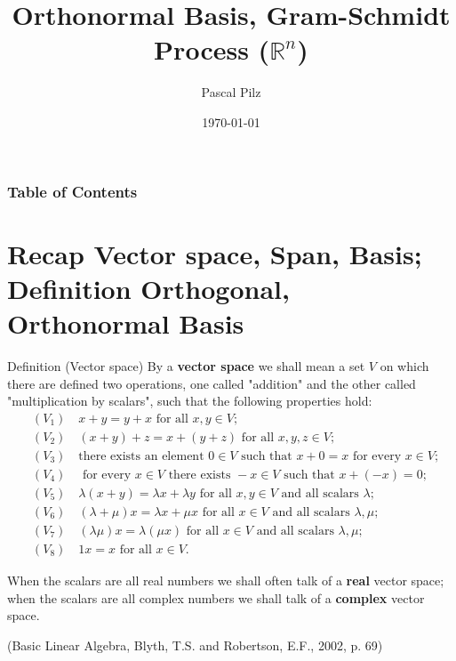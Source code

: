 \documentclass{beamer}
\title[Orthonormal Basis]{Orthonormal Basis, Gram-Schmidt Process ($\mathbb{R}^n$)}
\author{Pascal Pilz}
\institute{KO Mathematics for AI II}
\date{\today}
\begin{document}
\frame{\titlepage}

\begin{frame}
    \frametitle{Table of Contents}
    \tableofcontents
\end{frame}


\section{Recap Vector space, Span, Basis; Definition Orthogonal, Orthonormal Basis}

\begin{frame}
    \small
    \begin{block}{Definition (Vector space)}
        By a \textbf{vector space} we shall mean a set $V$ on which there are defined two operations, one called "addition" and the other called "multiplication by scalars", such that the following properties hold:
        \begin{align*}
            &(V_1) \quad x+y = y+x \text{ for all } x,y \in V;\\
            &(V_2) \quad (x+y)+z = x+(y+z) \text{ for all } x,y,z \in V;\\
            &(V_3) \quad \text{there exists an element } 0 \in V \text{ such that } x+0 = x \text{ for every } x \in V;\\
            &(V_4) \quad \text{ for every } x \in V \text{ there exists } -x \in V \text{ such that } x+(-x) = 0;\\
            &(V_5) \quad \lambda (x+y) = \lambda x + \lambda y \text{ for all } x,y \in V \text{ and all scalars } \lambda;\\
            &(V_6) \quad ( \lambda + \mu ) x = \lambda x + \mu x \text{ for all } x \in V \text{ and all scalars } \lambda, \mu;\\
            &(V_7) \quad (\lambda \mu) x = \lambda ( \mu x) \text{ for all } x \in V \text{ and all scalars } \lambda, \mu;\\
            &(V_8) \quad 1x = x \text{ for all } x \in V. 
        \end{align*}
        
        When the scalars are all real numbers we shall often talk of a \textbf{real} vector space;  when the scalars are all complex numbers we shall talk of a \textbf{complex} vector space.
        
        \par \vspace{1mm} (Basic Linear Algebra, Blyth, T.S. and Robertson, E.F., 2002, p. 69)
    \end{block}
\end{frame}
\end{document}
